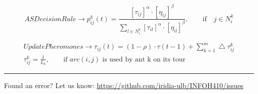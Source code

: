 \documentclass[11pt,a4paper]{article}
\theoremstyle{definition}%
\begin{document}
\begin{equation}\label{eq:deci}
	ASDecisionRule \rightarrow p_{ij}^k(t) = 
	\frac{\left[\tau_{ij}\right]^{\alpha}\cdot\left[\eta_{ij}\right]^\beta}
	 {\sum_{l \in N_i^k} 
	\left[\tau_{il}\right]^{\alpha}\cdot\left[\eta_{il}\right]^\beta},
	\qquad \text{if} \quad j\in N_i^k
\end{equation}

\begin{equation}\label{eq:phero}
\begin{aligned}
	UpdatePheromones \rightarrow \tau_{ij}(t) = 
	(1-\rho)\cdot\tau(t-1) + \sum_{k=1}^{m}\bigtriangleup\tau_{ij}^k 
	\\
	\tau_{ij}^k = \frac{1}{L_k}, \qquad \text{if $arc(i,j)$ is used 
	by 
	ant k on its tour}
\end{aligned}
\end{equation}

\noindent
\rule{\textwidth}{0.4pt}
\footnotesize{Found an error? Let us know: \url{https://github.com/iridia-ulb/INFOH410/issues}}
\end{document}
